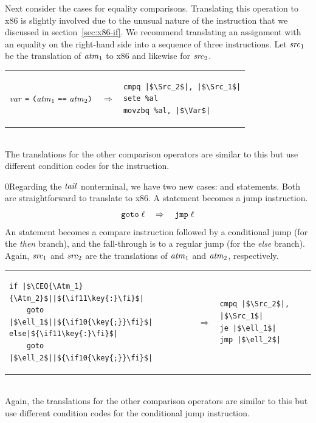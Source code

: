 \documentclass[7x10]{TimesAPriori_MIT}%
\def\racketEd{0}
\def\pythonEd{1}
\def\edition{1}
\newcommand{\racket}[1]{{\if\edition\racketEd{#1}\fi}}
\newcommand{\pythonColor}[0]{}
\newcommand{\python}[1]{{\if\edition\pythonEd\pythonColor #1\fi}}
\numberwithin{theorem}{chapter}
\numberwithin{definition}{chapter}
\numberwithin{equation}{chapter}
\begin{document}
Next consider the cases for equality comparisons.  Translating this
operation to x86 is slightly involved due to the unusual nature of the
 instruction that we discussed in section~\ref{sec:x86-if}.
We recommend translating an assignment with an equality on the
right-hand side into a sequence of three instructions. Let $\mathit{src}_1$
be the translation of $\mathit{atm}_1$ to x86 and likewise for $\mathit{src}_2$.\\
\begin{tabular}{lll}
\begin{minipage}{0.4\textwidth}
$\mathit{var}~\texttt{=}~ \texttt{(} \mathit{atm}_1~\texttt{==}~\mathit{atm}_2 \texttt{)}$ 
\end{minipage}
&
$\Rightarrow$
&
\begin{minipage}{0.4\textwidth}
\begin{lstlisting}
cmpq |$\Src_2$|, |$\Src_1$|
sete %al
movzbq %al, |$\Var$|
\end{lstlisting}
\end{minipage}
\end{tabular}  \\
The translations for the other comparison operators are similar to
this but use different condition codes for the  instruction.

\racket{Regarding the $\mathit{tail}$ nonterminal, we have two new cases:
  \key{goto} and \key{if} statements. Both are straightforward to
  translate to x86.}
%
A  statement becomes a jump instruction.
\[
\key{goto}\; \ell\racket{\key{;}} \quad \Rightarrow \quad \key{jmp}\;\ell
\]
%
An  statement becomes a compare instruction followed by a
conditional jump (for the \emph{then} branch), and the fall-through is to
a regular jump (for the \emph{else} branch). Again, $\mathit{src}_1$ and $\mathit{src}_2$
are the translations of $\mathit{atm}_1$ and $\mathit{atm}_2$, respectively.\\
\begin{tabular}{lll}
\begin{minipage}{0.4\textwidth}
\begin{lstlisting}
if |$\CEQ{\Atm_1}{\Atm_2}$||$\python{\key{:}}$|
    goto |$\ell_1$||$\racket{\key{;}}$|
else|$\python{\key{:}}$|
    goto |$\ell_2$||$\racket{\key{;}}$|
\end{lstlisting}
\end{minipage}
&
$\Rightarrow$
&
\begin{minipage}{0.4\textwidth}
\begin{lstlisting}
cmpq |$\Src_2$|, |$\Src_1$|
je |$\ell_1$|
jmp |$\ell_2$|
\end{lstlisting}
\end{minipage}
\end{tabular}  \\
Again, the translations for the other comparison operators are similar to this
but use different condition codes for the conditional jump instruction.
\end{document}

